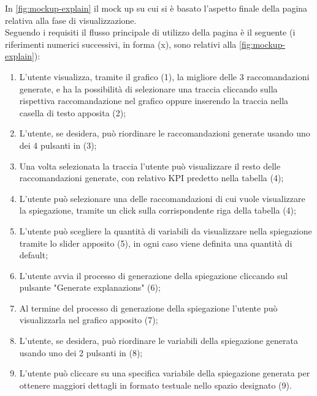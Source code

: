 In \autoref{fig:mockup-explain} il mock up su cui si è basato l'aspetto finale della pagina relativa alla fase di visualizzazione.
\\
Seguendo i requisiti il flusso principale di utilizzo della pagina è il seguente (i riferimenti numerici successivi, in forma (x), sono relativi alla \autoref{fig:mockup-explain}):

\begin{enumerate}
\item L'utente visualizza, tramite il grafico (1), la migliore delle 3 raccomandazioni generate, e ha la possibilità di selezionare una traccia cliccando sulla rispettiva raccomandazione nel grafico oppure inserendo la traccia nella casella di testo apposita (2);

\item L'utente, se desidera, può riordinare le raccomandazioni generate usando uno dei 4 pulsanti in (3);

\item Una volta selezionata la traccia l'utente può visualizzare il resto delle raccomandazioni generate, con relativo KPI predetto nella tabella (4);

\item L'utente può selezionare una delle raccomandazioni di cui vuole visualizzare la spiegazione, tramite un click sulla corrispondente riga della tabella (4);

\item L'utente può scegliere la quantità di variabili da visualizzare nella spiegazione tramite lo \gls{slider} apposito (5), in ogni caso viene definita una quantità di default;

\item L'utente avvia il processo di generazione della spiegazione cliccando sul pulsante "Generate explanazions" (6);

\item Al termine del processo di generazione della spiegazione l'utente può visualizzarla nel grafico apposito (7);

\item L'utente, se desidera, può riordinare le variabili della spiegazione generata usando uno dei 2 pulsanti in (8);

\item L'utente può cliccare su una specifica variabile della spiegazione generata per ottenere maggiori dettagli in formato testuale nello spazio designato (9).

\end{enumerate}

